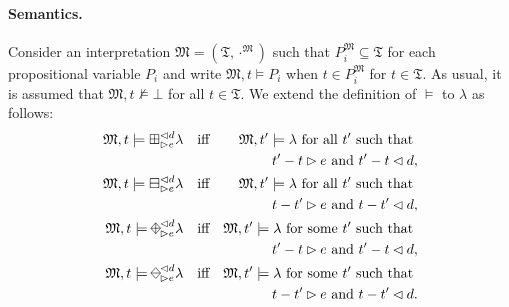 \documentclass{article}
\newcommand{\Mmf}{\mathfrak{M}}
\newcommand{\diamondplus}{%
  \raisebox{-.15ex}{\begin{tikzpicture}
    \useasboundingbox (-0.7ex, -0.9ex) rectangle (0.7ex, 0.9ex);
    \node (w) at (-0.8ex,0) {};
    \node (e) at (+0.8ex,0) {};
    \node (s) at (0,-.9ex) {};
    \node (n) at (0,+.9ex) {};
    \draw (n.center) -- (e.center) -- (s.center) -- (w.center) -- (n.center);
    \draw (n.center) -- (s.center);
    \draw (e.center) -- (w.center);
  \end{tikzpicture}}}
\newcommand{\diamondminus}{%
  \raisebox{-.15ex}{\begin{tikzpicture}
    \useasboundingbox (-0.7ex, -0.9ex) rectangle (0.7ex, 0.9ex);
    \node (w) at (-0.8ex,0) {};
    \node (e) at (+0.8ex,0) {};
    \node (s) at (0,-.9ex) {};
    \node (n) at (0,+.9ex) {};
    \draw (n.center) -- (e.center) -- (s.center) -- (w.center) -- (n.center);
    \draw (e.center) -- (w.center);
  \end{tikzpicture}}}
\begin{document}
\paragraph{Semantics.} Consider an interpretation $\Mmf = (\mathfrak{T}, \cdot^\Mmf)$ such that $P_i^\Mmf \subseteq \mathfrak{T}$ for each propositional variable $P_i$ and write $\Mmf, t \models P_i$ when $t \in P_i^\Mmf$ for $t \in \mathfrak{T}$. As usual, it is assumed that $\Mmf, t \not \models \bot$ for all $t \in \mathfrak{T}$. We extend the definition of $\models$ to $\lambda$ as follows:
%
\begin{align}\label{prop-semantics1}
\notag \Mmf, t \models \boxplus^{\lhd d}_{\rhd e}\lambda \quad &\text{iff} & \Mmf, t' \models \lambda \text{ for all } t' \text{ such that }\\
 & & t' -t \rhd e \text{ and }t' - t \lhd d,\\
%
\notag \Mmf, t \models \boxminus^{\lhd d}_{\rhd e}\lambda \quad &\text{iff} & \Mmf, t' \models \lambda \text{ for all } t' \text{ such that }\\
 &&  t -t' \rhd e \text{ and } t - t' \lhd d,\\
%
\notag \Mmf, t \models \diamondplus^{\lhd d}_{\rhd e}\lambda \quad &\text{iff} & \Mmf, t' \models \lambda \text{ for some } t' \text{ such that }\\
 && t' -t \rhd e \text{ and } t' - t \lhd d,\\
%
\notag \Mmf, t \models \diamondminus^{\lhd d}_{\rhd e}\lambda \quad &\text{iff} & \Mmf, t' \models \lambda \text{ for some } t' \text{ such that }\\
 && t -t' \rhd e \text{ and } t - t' \lhd d. \label{prop-semantics4}
\end{align}
%
\end{document}
